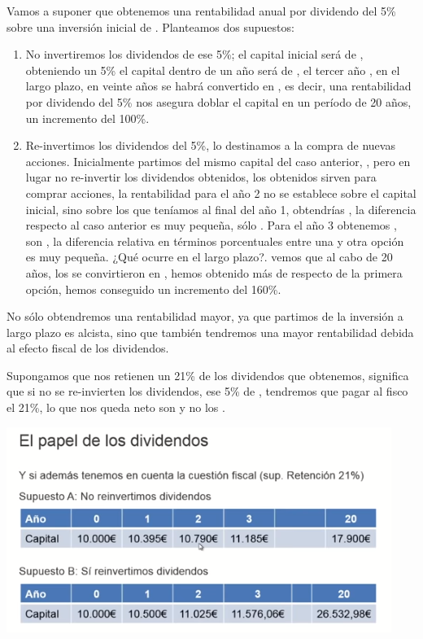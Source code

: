 Vamos a suponer que obtenemos una rentabilidad anual por dividendo del 5\% sobre una inversión inicial de . Planteamos dos supuestos:
\begin{enumerate}
    \item No invertiremos los dividendos de ese 5\%; el capital inicial será de , obteniendo un 5\% el capital dentro de un año  será de , el tercer año , en el largo plazo, en veinte años se habrá convertido en , es decir, una rentabilidad por dividendo del 5\% nos asegura doblar el capital en un período de 20 años, un incremento del 100\%.
    \item Re-invertimos los dividendos del 5\%, lo destinamos a la compra de nuevas acciones. Inicialmente partimos del mismo capital del caso anterior, , pero en lugar no re-invertir los dividendos obtenidos, los  obtenidos sirven para comprar acciones, la rentabilidad para el año 2 no se establece sobre el capital inicial, sino sobre los  que teníamos al final del año 1, obtendrías , la diferencia respecto al caso anterior es muy pequeña, sólo . Para el año 3 obtenemos , son , la diferencia relativa en términos porcentuales entre una y otra opción es muy pequeña. ¿Qué ocurre en el largo plazo?. vemos que al cabo de 20 años, los  se convirtieron en , hemos obtenido más de  respecto de la primera opción, hemos conseguido un incremento del 160\%.
\end{enumerate}

No sólo obtendremos una rentabilidad mayor, ya que partimos de la inversión a largo plazo es alcista, sino que también tendremos una mayor rentabilidad debida al efecto fiscal de los dividendos.

Supongamos que nos retienen un 21\% de los dividendos que obtenemos, significa que si no se re-invierten los dividendos, ese 5\% de , tendremos que pagar al fisco el 21\%, lo que nos queda neto son  y no los .

\begin{center}
    \includegraphics[scale=.90]{images/papel-dividendos-fiscal.png}
\end{center}

